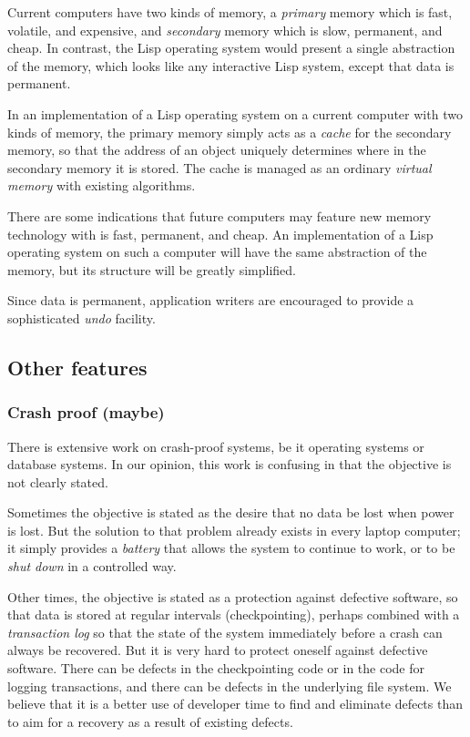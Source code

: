 Current computers have two kinds of memory, a \emph{primary} memory
which is fast, volatile, and expensive, and \emph{secondary} memory
which is slow, permanent, and cheap.  In contrast, the Lisp operating
system would present a single abstraction of the memory, which looks
like any interactive Lisp system, except that data is permanent.

In an implementation of a Lisp operating system on a current computer
with two kinds of memory, the primary memory simply acts as a
\emph{cache} for the secondary memory, so that the address of an
object uniquely determines where in the secondary memory it is stored.
The cache is managed as an ordinary \emph{virtual memory} with
existing algorithms.

There are some indications that future computers may feature new
memory technology with is fast, permanent, and cheap.  An
implementation of a Lisp operating system on such a computer will have
the same abstraction of the memory, but its structure will be greatly
simplified.

Since data is permanent, application writers are encouraged to
provide a sophisticated \emph{undo} facility.  

\subsection{Other features}

\subsubsection{Crash proof (maybe)}

There is extensive work on crash-proof systems, be it operating
systems or database systems.  In our opinion, this work is
confusing in that the objective is not clearly stated.

Sometimes the objective is stated as the desire that no data be lost
when power is lost.  But the solution to that problem already exists
in every laptop computer; it simply provides a \emph{battery} that
allows the system to continue to work, or to be \emph{shut down} in a
controlled way. 

Other times, the objective is stated as a protection against
defective software, so that data is stored at regular intervals
(checkpointing), perhaps combined with a \emph{transaction log} so
that the state of the system immediately before a crash can always
be recovered.  But it is very hard to protect oneself against
defective software.  There can be defects in the checkpointing code
or in the code for logging transactions, and there can be defects in
the underlying file system.  We believe that it is a better use of
developer time to find and eliminate defects than to aim for a
recovery as a result of existing defects.

